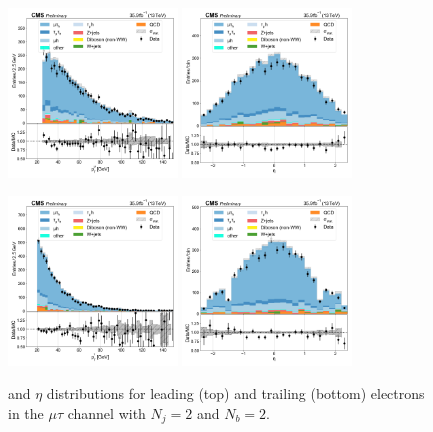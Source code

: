 \begin{figure}[htb!]
    \centering
    \includegraphics[width=0.4\textwidth]{chapters/Analysis/sectionPlots/figures/data_mc_overlays/mutau_2016_cat_eq2_eq2_signal_linear_lepton_lepton1_pt}
    \includegraphics[width=0.4\textwidth]{chapters/Analysis/sectionPlots/figures/data_mc_overlays/mutau_2016_cat_eq2_eq2_signal_linear_lepton_lepton1_eta}

    \includegraphics[width=0.4\textwidth]{chapters/Analysis/sectionPlots/figures/data_mc_overlays/mutau_2016_cat_eq2_eq2_signal_linear_lepton_lepton2_pt}
    \includegraphics[width=0.4\textwidth]{chapters/Analysis/sectionPlots/figures/data_mc_overlays/mutau_2016_cat_eq2_eq2_signal_linear_lepton_lepton2_eta}
    \caption{\pt and $\eta$ distributions for leading (top) and trailing
        (bottom) electrons in the $\mu\tau$ channel with $N_{j} = 2$ and
        $N_{b} = 2$.}
    \label{fig:analysis:plots:mutau_6_kinematic}
\end{figure}

